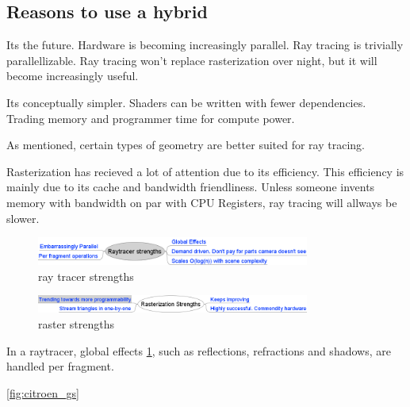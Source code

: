 \subsection{Reasons to use a hybrid}

Its the future. Hardware is becoming increasingly parallel. Ray tracing is trivially parallellizable. Ray tracing won't replace rasterization over night, but it will become increasingly useful.

Its conceptually simpler. Shaders can be written with fewer dependencies. Trading memory and programmer time for compute power.

As mentioned, certain types of geometry are better suited for ray tracing.

Rasterization has recieved a lot of attention due to its efficiency. This efficiency is mainly due to its cache and bandwidth friendliness. Unless someone invents memory with bandwidth on par with CPU Registers, ray tracing will allways be slower.

	\begin{figure}[ht]
		\centering \includegraphics[width=0.80\textwidth]{Media/why_hybrid_raymindmap.png}
		\caption{ray tracer strengths}
		\label{fig:ray_mmap}
	\end{figure}
	
	\begin{figure}[ht]
		\centering \includegraphics[width=0.80\textwidth]{Media/why_hybrid_rastermindmap.png}
		\caption{raster strengths}
		\label{fig:raster_mmap}
	\end{figure}

In a raytracer, global effects \ref{fig:ray_mmap}, such as reflections, refractions and shadows, are handled per fragment.

\ref{fig:citroen_gs}